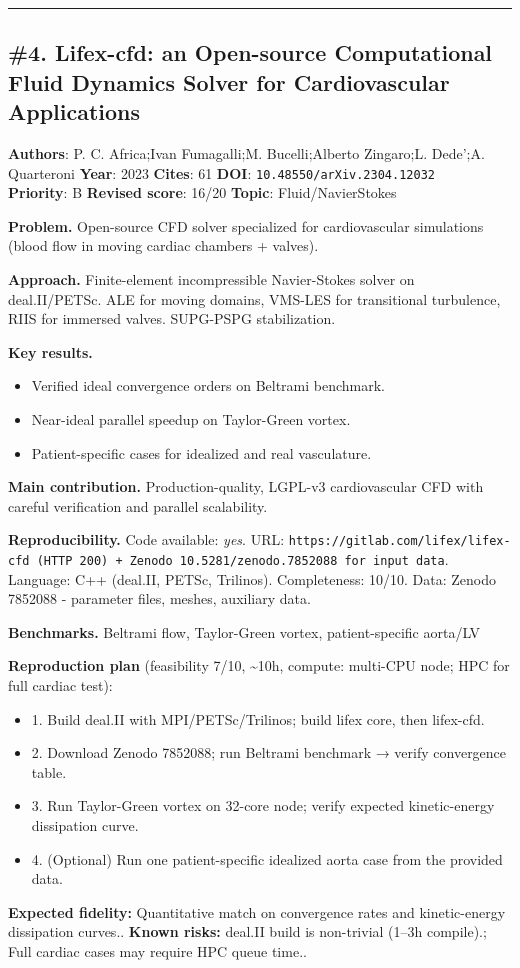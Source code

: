 \documentclass[10pt,letterpaper]{article}
\begin{document}
\medskip\hrule\medskip

\subsection*{\#4. Lifex-cfd: an Open-source Computational Fluid Dynamics Solver for Cardiovascular Applications}
\textbf{Authors}: P. C. Africa;Ivan Fumagalli;M. Bucelli;Alberto Zingaro;L. Dede’;A. Quarteroni \textbullet{} \textbf{Year}: 2023 \textbullet{} \textbf{Cites}: 61 \textbullet{} \textbf{DOI}: \texttt{10.48550/arXiv.2304.12032} \\
\textbf{Priority}: B \textbullet{} \textbf{Revised score}: 16/20 \textbullet{} \textbf{Topic}: Fluid/NavierStokes

\textbf{Problem.} Open-source CFD solver specialized for cardiovascular simulations (blood flow in moving cardiac chambers + valves).

\textbf{Approach.} Finite-element incompressible Navier-Stokes solver on deal.II/PETSc. ALE for moving domains, VMS-LES for transitional turbulence, RIIS for immersed valves. SUPG-PSPG stabilization.

\textbf{Key results.}
\begin{itemize}
\item Verified ideal convergence orders on Beltrami benchmark.
\item Near-ideal parallel speedup on Taylor-Green vortex.
\item Patient-specific cases for idealized and real vasculature.
\end{itemize}

\textbf{Main contribution.} Production-quality, LGPL-v3 cardiovascular CFD with careful verification and parallel scalability.

\textbf{Reproducibility.} Code available: \emph{yes}. URL: \texttt{https://gitlab.com/lifex/lifex-cfd (HTTP 200) + Zenodo 10.5281/zenodo.7852088 for input data}. Language: C++ (deal.II, PETSc, Trilinos). Completeness: 10/10. Data: Zenodo 7852088 - parameter files, meshes, auxiliary data.

\textbf{Benchmarks.} Beltrami flow, Taylor-Green vortex, patient-specific aorta/LV

\textbf{Reproduction plan} (feasibility 7/10, \textasciitilde10h, compute: multi-CPU node; HPC for full cardiac test):
\begin{itemize}
\item 1. Build deal.II with MPI/PETSc/Trilinos; build lifex core, then lifex-cfd.
\item 2. Download Zenodo 7852088; run Beltrami benchmark → verify convergence table.
\item 3. Run Taylor-Green vortex on 32-core node; verify expected kinetic-energy dissipation curve.
\item 4. (Optional) Run one patient-specific idealized aorta case from the provided data.
\end{itemize}
\textbf{Expected fidelity:} Quantitative match on convergence rates and kinetic-energy dissipation curves.. \textbf{Known risks:} deal.II build is non-trivial (1–3h compile).; Full cardiac cases may require HPC queue time..
\end{document}
